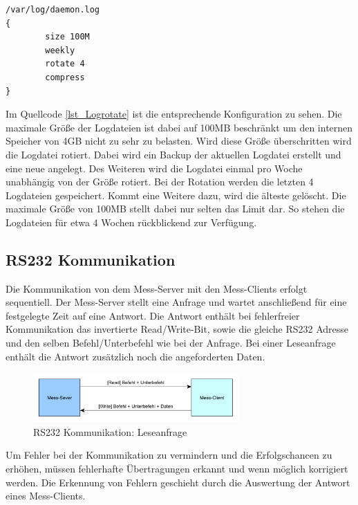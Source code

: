 \begin{lstlisting}[caption={Logrotate},label=lst_Logrotate]
/var/log/daemon.log
{
        size 100M
        weekly
        rotate 4
        compress
}
\end{lstlisting}

Im Quellcode \ref{lst_Logrotate} ist die entsprechende Konfiguration zu sehen. Die maximale Größe der Logdateien ist dabei auf 100MB beschränkt um den internen Speicher von 4GB nicht zu sehr zu belasten. Wird diese Größe überschritten wird die Logdatei rotiert. Dabei wird ein Backup der aktuellen Logdatei erstellt und eine neue angelegt. Des Weiteren wird die Logdatei einmal pro Woche unabhängig von der Größe rotiert. Bei der Rotation werden die letzten 4 Logdateien gespeichert. Kommt eine Weitere dazu, wird die älteste gelöscht. Die maximale Größe von 100MB stellt dabei nur selten das Limit dar. So stehen die Logdateien für etwa 4 Wochen rückblickend zur Verfügung.



\subsection{RS232 Kommunikation}

Die Kommunikation von dem Mess-Server mit den Mess-Clients erfolgt sequentiell. Der Mess-Server stellt eine Anfrage und wartet anschließend für eine festgelegte Zeit auf eine Antwort. Die Antwort enthält bei fehlerfreier Kommunikation das invertierte Read/Write-Bit, sowie die gleiche RS232 Adresse und den selben Befehl/Unterbefehl wie bei der Anfrage. Bei einer Leseanfrage enthält die Antwort zusätzlich noch die angeforderten Daten.\\

\begin{figure}[H]
\begin{center}
\includegraphics[width=0.7\textwidth ]{img/general/RS232Uebertragung.pdf}
\caption{RS232 Kommunikation: Leseanfrage}
\label{figure_RS232Kommunikation}
\end{center}
\end{figure}

Um Fehler bei der Kommunikation zu vermindern und die Erfolgschancen zu erhöhen, müssen fehlerhafte Übertragungen erkannt und wenn möglich korrigiert werden. Die Erkennung von Fehlern geschieht durch die Auswertung der Antwort eines Mess-Clients.

